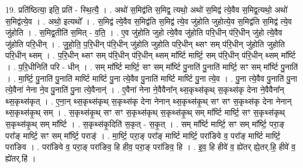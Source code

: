 \documentclass[17pt]{extarticle}
\begin{document}
19. प्रति॑ष्ठित्या॒ इति॒ प्रति॑ - स्थि॒त्यै॒ । . अथो॑ स॒मिद्व॑ति स॒मिद्व॒ त्यथो॒ अथो॑ स॒मिद्व॑ त्ये॒वैव स॒मिद्व॒त्यथो॒ अथो॑ स॒मिद्व॑त्ये॒व । . अथो॒ इत्यथो᳚ । . स॒मिद्व॑ त्ये॒वैव स॒मिद्व॑ति स॒मिद्व॑ त्ये॒व जु॑होति जुहोत्ये॒व स॒मिद्व॑ति स॒मिद्व॑ त्ये॒व जु॑होति । . स॒मिद्व॒तीति॑ स॒मित् - व॒ति॒ । . ए॒व जु॑होति जुहो त्ये॒वैव जु॑होति परि॒धीन् प॑रि॒धीन् जु॑हो त्ये॒वैव जु॑होति परि॒धीन् । . जु॒हो॒ति॒ प॒रि॒धीन् प॑रि॒धीन् जु॑होति जुहोति परि॒धीन् थ्सꣳ सम् प॑रि॒धीन् जु॑होति जुहोति परि॒धीन् थ्सम् । . प॒रि॒धीन् थ्सꣳ सम् प॑रि॒धीन् प॑रि॒धीन् थ्सम् मा᳚र्ष्टि मार्ष्टि॒ सम् प॑रि॒धीन् प॑रि॒धीन् थ्सम् मा᳚र्ष्टि । . प॒रि॒धीनिति॑ परि - धीन् । . सम् मा᳚र्ष्टि मार्ष्टि॒ सꣳ सम् मा᳚र्ष्टि पु॒नाति॑ पु॒नाति॑ मार्ष्टि॒ सꣳ सम् मा᳚र्ष्टि पु॒नाति॑ । . मा॒र्ष्टि॒ पु॒नाति॑ पु॒नाति॑ मार्ष्टि मार्ष्टि पु॒ना त्ये॒वैव पु॒नाति॑ मार्ष्टि मार्ष्टि पु॒ना त्ये॒व । . पु॒ना त्ये॒वैव पु॒नाति॑ पु॒ना त्ये॒वैना॑ नेना ने॒व पु॒नाति॑ पु॒ना त्ये॒वैनान्॑ । . ए॒वैना॑ नेना ने॒वैवैना᳚न् थ्स॒कृथ्स॑कृथ् स॒कृथ्स॑कृ देना ने॒वैवैना᳚न् थ्स॒कृथ्स॑कृत् । . ए॒ना॒न् थ्स॒कृथ्स॑कृथ् स॒कृथ्स॑कृ देना नेनान् थ्स॒कृथ्स॑कृ॒थ् सꣳ सꣳ स॒कृथ्स॑कृ देना नेनान् थ्स॒कृथ्स॑कृ॒थ् सम् । . स॒कृथ्स॑कृ॒थ् सꣳ सꣳ स॒कृथ्स॑कृथ् स॒कृथ्स॑कृ॒थ् सम् मा᳚र्ष्टि मार्ष्टि॒ सꣳ स॒कृथ्स॑कृथ् स॒कृथ्स॑कृ॒थ् सम् मा᳚र्ष्टि । . स॒कृथ्स॑कृ॒दिति॑ स॒कृत् - स॒कृ॒त् । . सम् मा᳚र्ष्टि मार्ष्टि॒ सꣳ सम् मा᳚र्ष्टि॒ परा॒ङ् परा᳚ङ् मार्ष्टि॒ सꣳ सम् मा᳚र्ष्टि॒ पराङ्॑ । . मा॒र्ष्टि॒ परा॒ङ् परा᳚ङ् मार्ष्टि मार्ष्टि॒ परा॑ङिवे व॒ परा᳚ङ् मार्ष्टि मार्ष्टि॒ परा॑ङिव । . परा॑ङिवे व॒ परा॒ङ् परा॑ङिव॒ हि हीव॒ परा॒ङ् परा॑ङिव॒ हि । . इ॒व॒ हि हीवे॑ व॒ ह्ये॑तर् ह्ये॒तर्.हि॒ हीवे॑ व॒ ह्ये॑तर्.हि॑ । \newline
\end{document}
